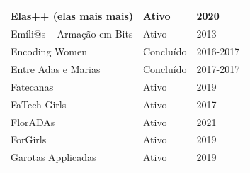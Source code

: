 \begin{longtable}{|l|l|l|}
Elas++ (elas mais mais)                                                                                                                                     & Ativo                        & 2020                        \\ \hline
  
Emíli@s – Armação em Bits                                                                                                                                   & Ativo                        & 2013                        \\ \hline
Encoding Women                                                                                                                                              & Concluído                    & 2016-2017                   \\ \hline
Entre Adas e Marias                                                                                                                                         & Concluído                    & 2017-2017                   \\ \hline
Fatecanas                                                                                                                                                   & Ativo                        & 2019                        \\ \hline
  
FaTech Girls                                                                                                                                                & Ativo                        & 2017                        \\ \hline
FlorADAs                                                                                                                                                    & Ativo                        & 2021                        \\ \hline
  
ForGirls                                                                                                                                                    & Ativo                        & 2019                        \\ \hline
  
Garotas Applicadas                                                                                                                                          & Ativo                        & 2019                        \\ \hline
  

\end{longtable}
